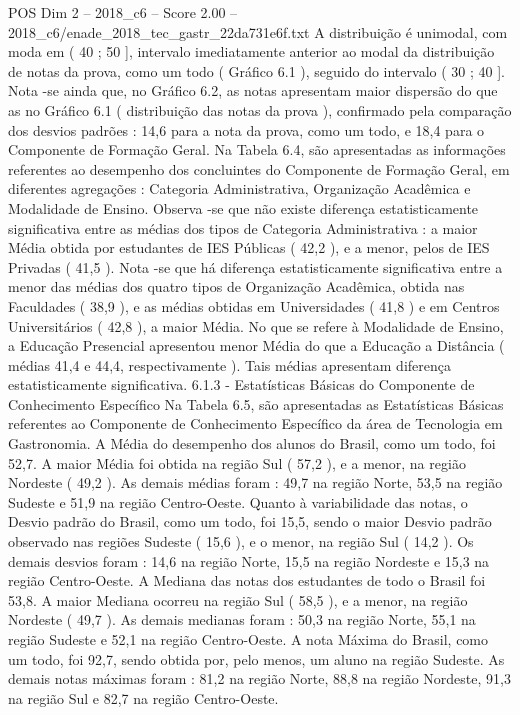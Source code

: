 \begin{textsample}{POS Dim 2 – 2018\_c6 – Score 2.00 – 2018\_c6/enade\_2018\_tec\_gastr\_22da731e6f.txt}
A distribuição é unimodal, com moda em ( 40 ; 50 ], intervalo imediatamente anterior ao modal da distribuição de notas da prova, como um todo ( Gráfico 6.1 ), seguido do intervalo ( 30 ; 40 ].
Nota -se ainda que, no Gráfico 6.2, as notas apresentam maior dispersão do que as no Gráfico 6.1 ( distribuição das notas da prova ), confirmado pela comparação dos desvios padrões : 14,6 para a nota da prova, como um todo, e 18,4 para o Componente de Formação Geral.
Na Tabela 6.4, são apresentadas as informações referentes ao desempenho dos concluintes do Componente de Formação Geral, em diferentes agregações : Categoria Administrativa, Organização Acadêmica e Modalidade de Ensino.
Observa -se que não existe diferença estatisticamente significativa entre as médias dos tipos de Categoria Administrativa : a maior Média obtida por estudantes de IES Públicas ( 42,2 ), e a menor, pelos de IES Privadas ( 41,5 ).
Nota -se que há diferença estatisticamente significativa entre a menor das médias dos quatro tipos de Organização Acadêmica, obtida nas Faculdades ( 38,9 ), e as médias obtidas em Universidades ( 41,8 ) e em Centros Universitários ( 42,8 ), a maior Média.
No que se refere à Modalidade de Ensino, a Educação Presencial apresentou menor Média do que a Educação a Distância ( médias 41,4 e 44,4, respectivamente ).
Tais médias apresentam diferença estatisticamente significativa. 6.1.3 - Estatísticas Básicas do Componente de Conhecimento Específico Na Tabela 6.5, são apresentadas as Estatísticas Básicas referentes ao Componente de Conhecimento Específico da área de Tecnologia em Gastronomia.
A Média do desempenho dos alunos do Brasil, como um todo, foi 52,7.
A maior Média foi obtida na região Sul ( 57,2 ), e a menor, na região Nordeste ( 49,2 ).
As demais médias foram : 49,7 na região Norte, 53,5 na região Sudeste e 51,9 na região Centro-Oeste.
Quanto à variabilidade das notas, o Desvio padrão do Brasil, como um todo, foi 15,5, sendo o maior Desvio padrão observado nas regiões Sudeste ( 15,6 ), e o menor, na região Sul ( 14,2 ).
Os demais desvios foram : 14,6 na região Norte, 15,5 na região Nordeste e 15,3 na região Centro-Oeste.
A Mediana das notas dos estudantes de todo o Brasil foi 53,8.
A maior Mediana ocorreu na região Sul ( 58,5 ), e a menor, na região Nordeste ( 49,7 ).
As demais medianas foram : 50,3 na região Norte, 55,1 na região Sudeste e 52,1 na região Centro-Oeste.
A nota Máxima do Brasil, como um todo, foi 92,7, sendo obtida por, pelo menos, um aluno na região Sudeste.
As demais notas máximas foram : 81,2 na região Norte, 88,8 na região Nordeste, 91,3 na região Sul e 82,7 na região Centro-Oeste.

\end{textsample}
